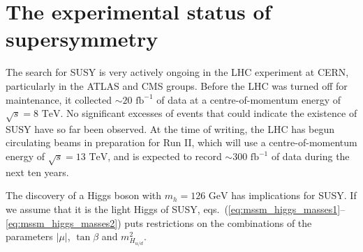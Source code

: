 \documentclass[twoside,english]{uiofysmaster}
\begin{document}



\section{The experimental status of supersymmetry}

The search for SUSY is very actively ongoing in the LHC experiment at CERN, particularly in the ATLAS and CMS groups. Before the LHC was turned off for maintenance, it collected $\sim 20 \,\, \mathrm{fb}^{-1}$ of data at a centre-of-momentum energy of $\sqrt{s} = 8\,\,\mathrm{TeV}$. No significant excesses of events that could indicate the existence of SUSY have so far been observed. At the time of writing, the LHC has begun circulating beams in preparation for Run II, which will use a centre-of-momentum energy of $\sqrt{s} = 13\,\,\mathrm{TeV}$, and is expected to record $\sim 300 \,\,\mathrm{fb}^{-1}$ of data during the next ten years.

The discovery of a Higgs boson with $m_h = 126 \,\,\mathrm{GeV}$ has implications for SUSY. If we assume that it is the light Higgs of SUSY, eqs.\ (\ref{eq:mssm_higgs_masses1}--\ref{eq:mssm_higgs_masses2}) puts restrictions on the combinations of the parameters $|\mu|$, $\tan\beta$ and $m^2_{H_{u/d}}$.
\end{document}
